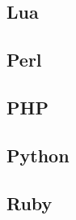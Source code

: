 \documentclass{KodeBook}
\begin{document}
\subsection{Lua}


\subsection{Perl}

%

\subsection{PHP}

%

\subsection{Python}

%

\subsection{Ruby}

%




\ifx\wholebook\relax\else
% 
% 
	
\end{document}
